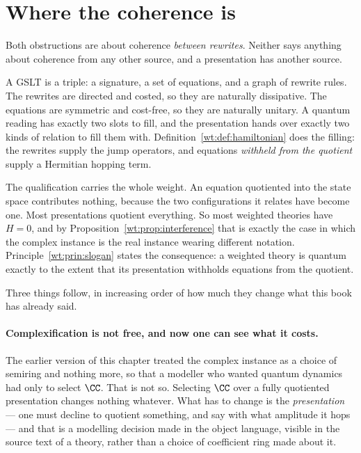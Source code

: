 \section{Where the coherence is}
\label{sec:coherence}

Both obstructions are about coherence \emph{between rewrites}.  Neither
says anything about coherence from any other source, and a presentation
has another source.

A GSLT is a triple: a signature, a set of equations, and a graph of
rewrite rules.  The rewrites are directed and costed, so they are
naturally dissipative.  The equations are symmetric and cost-free, so they
are naturally unitary.  A quantum reading has exactly two slots to fill,
and the presentation hands over exactly two kinds of relation to fill them
with.  Definition~\ref{wt:def:hamiltonian} does the filling: the rewrites
supply the jump operators, and equations \emph{withheld from the quotient}
supply a Hermitian hopping term.

The qualification carries the whole weight.  An equation quotiented into
the state space contributes nothing, because the two configurations it
relates have become one.  Most presentations quotient everything.  So most
weighted theories have $H = 0$, and by
Proposition~\ref{wt:prop:interference} that is exactly the case in which
the complex instance is the real instance wearing different notation.
Principle~\ref{wt:prin:slogan} states the consequence: a weighted theory
is quantum exactly to the extent that its presentation withholds equations
from the quotient.

Three things follow, in increasing order of how much they change what this
book has already said.

\paragraph{Complexification is not free, and now one can see what it costs.}
The earlier version of this chapter treated the complex instance as a
choice of semiring and nothing more, so that a modeller who wanted quantum
dynamics had only to select $\CC$.  That is not so.  Selecting $\CC$ over a
fully quotiented presentation changes nothing whatever.  What has to change
is the \emph{presentation} --- one must decline to quotient something, and
say with what amplitude it hops --- and that is a modelling decision made
in the object language, visible in the source text of a theory, rather
than a choice of coefficient ring made about it.


